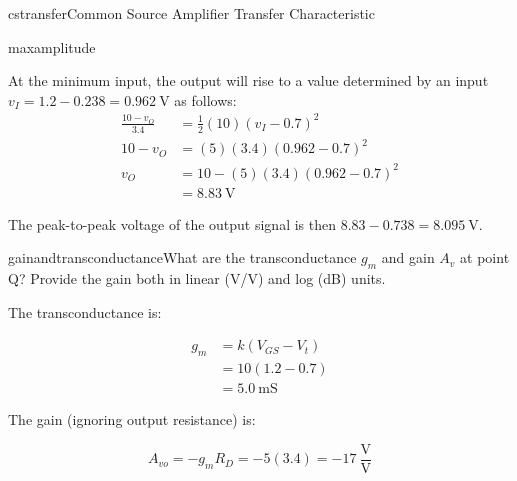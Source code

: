 \begin{mainquestion}{cstransfer}{Common Source Amplifier Transfer Characteristic}
\begin{partquestion}{maxamplitude}
\begin{answer}
At the minimum input, the output will rise to a value determined by an input $v_{I} = 1.2 - 0.238 = \qty{0.962}{\volt}$ as follows:
\begin{align*}
    \frac{10 - v_O}{3.4} &= \frac{1}{2}(10)(v_I - 0.7)^2 \\
    10 - v_O &= (5)(3.4)(0.962 - 0.7)^2 \\
    v_O &= 10 - (5)(3.4)(0.962 - 0.7)^2 \\
    &= \qty{8.83}{\volt}
\end{align*}

The peak-to-peak voltage of the output signal is then $8.83 - 0.738 = \qty{8.095}{\volt}$.


\begin{kaitlyn}
    \noindent{}
\end{kaitlyn}

\end{answer}
\end{partquestion}

\begin{partquestion}{gainandtransconductance}{What are the transconductance $g_{m}$ and gain $A_{v}$ at point Q? Provide the gain both in linear (V/V) and log (dB) units.}
\begin{answer}


The transconductance is:

\begin{align*}
    g_m &= k(V_{GS} - V_t) \\
    &= 10(1.2 - 0.7) \\
    &= \qty{5.0}{\milli\siemens}
\end{align*}

The gain (ignoring output resistance) is:

\[
A_{vo} = -g_{m} R_{D} = -5(3.4) = -17\ \frac{\text{V}}{\text{V}}
\]


\end{answer}
\end{partquestion}
\end{mainquestion}
